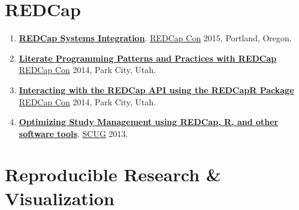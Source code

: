 \documentclass[
]{book}
\providecommand{\tightlist}{%
  \setlength{\itemsep}{0pt}\setlength{\parskip}{0pt}}
\begin{document}
\hypertarget{redcap}{%
\section{REDCap}\label{redcap}}

\begin{enumerate}
\def\labelenumi{\arabic{enumi}.}
\tightlist
\item
  \textbf{\href{https://github.com/OuhscBbmc/BbmcResources/blob/master/Publications/Presentation2015-09-REDCapCon/REDCapIntegration.pdf}{REDCap Systems Integration}}. \href{https://projectredcap.org/about/redcapcon/}{REDCap Con} 2015, Portland, Oregon.
\item
  \textbf{\href{https://github.com/OuhscBbmc/RedcapExamplesAndPatterns/blob/master/Publications/Presentation-2014-09-REDCapCon/LiterateProgrammingPatternsAndPracticesWithREDCap.pptx}{Literate Programming Patterns and Practices with REDCap}} \href{https://projectredcap.org/about/redcapcon/}{REDCap Con} 2014, Park City, Utah.
\item
  \textbf{\href{https://github.com/OuhscBbmc/RedcapExamplesAndPatterns/blob/master/Publications/Presentation-2014-09-REDCapCon/REDCapR.pptx}{Interacting with the REDCap API using the REDCapR Package}} \href{https://projectredcap.org/about/redcapcon/}{REDCap Con} 2014, Park City, Utah.
\item
  \textbf{\href{https://github.com/OuhscBbmc/StatisticalComputing/blob/master/2013_Presentations/03_March/RedcapForUserGroup.pptx}{Optimizing Study Management using REDCap, R, and other software tools}}. \href{https://github.com/OuhscBbmc/StatisticalComputing}{SCUG} 2013.
\end{enumerate}

\hypertarget{reproducible-research-visualization}{%
\section{Reproducible Research \& Visualization}\label{reproducible-research-visualization}}
\end{document}
